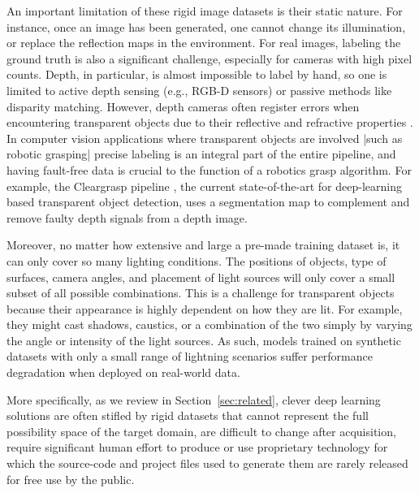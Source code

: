 \documentclass[conference]{IEEEtran}
\begin{document}
 




An important limitation of these rigid image datasets is their static nature. For instance, once an image has been generated, one cannot change its illumination, or replace the reflection maps in the environment. For real images, labeling the ground truth is also a significant challenge, especially for cameras with high pixel counts. \color{black} Depth, in particular, is almost impossible to label by hand, so one is limited to active depth sensing (e.g., RGB-D sensors) or passive methods like disparity matching. However, depth cameras often register errors when encountering transparent objects due to their reflective and refractive properties \cite{cleargrasp}. In computer vision applications where transparent objects are involved |such as robotic grasping| precise labeling is an integral part of the entire pipeline, and having fault-free data is crucial to the function of a robotics grasp algorithm. For example, the Cleargrasp pipeline \cite{cleargrasp}, the current state-of-the-art for deep-learning based transparent object detection, uses a segmentation map to complement and remove faulty depth signals from a depth image.







Moreover, no matter how extensive and large a pre-made training dataset is, it can only cover so many lighting conditions. The positions of objects, type of surfaces, camera angles, and placement of light sources will only cover a small subset of all possible combinations. This is a challenge for transparent objects because their appearance is highly dependent on how they are lit. For example, they might cast shadows, caustics, or a combination of the two simply by varying the angle or intensity of the light sources. As such, models trained on synthetic datasets with only a small range of lightning scenarios suffer performance degradation when deployed on real-world data. 









More specifically, as we review in Section~\ref{sec:related}, clever deep learning solutions are often stifled by rigid datasets that cannot represent the full possibility space of the target domain, are difficult to change after acquisition, require significant human effort to produce or use proprietary technology for which the source-code and project files used to generate them are rarely released for free use by the public.
\end{document}

